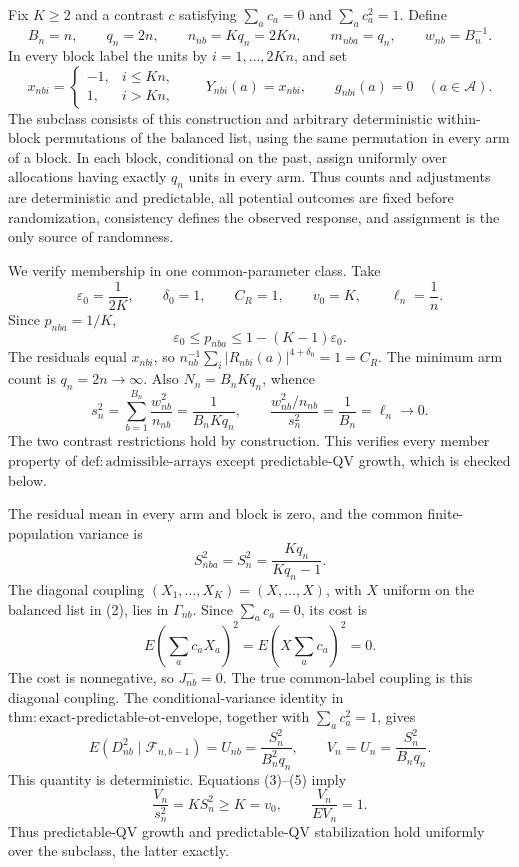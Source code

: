 Fix \(K\ge2\) and a contrast \(c\) satisfying \(\sum_ac_a=0\) and \(\sum_ac_a^2=1\). Define
\[
B_n=n,\qquad q_n=2n,\qquad n_{nb}=Kq_n=2Kn,
\qquad m_{nba}=q_n,\qquad w_{nb}=B_n^{-1}.
\tag{1}
\]
In every block label the units by \(i=1,\ldots,2Kn\), and set
\[
x_{nbi}=\begin{cases}-1,&i\le Kn,\\1,&i>Kn,\end{cases}
\qquad
Y_{nbi}(a)=x_{nbi},\qquad g_{nbi}(a)=0
\quad(a\in\mathcal A).
\tag{2}
\]
The subclass consists of this construction and arbitrary deterministic within-block permutations of the balanced list, using the same permutation in every arm of a block. In each block, conditional on the past, assign uniformly over allocations having exactly \(q_n\) units in every arm. Thus counts and adjustments are deterministic and predictable, all potential outcomes are fixed before randomization, consistency defines the observed response, and assignment is the only source of randomness.

We verify membership in one common-parameter class. Take
\[
\varepsilon_0=\frac1{2K},\qquad \delta_0=1,
\qquad C_R=1,\qquad v_0=K,\qquad \ell_n=\frac1n.
\]
Since \(p_{nba}=1/K\),
\[
\varepsilon_0\le p_{nba}\le1-(K-1)\varepsilon_0.
\]
The residuals equal \(x_{nbi}\), so
\(n_{nb}^{-1}\sum_i|R_{nbi}(a)|^{4+\delta_0}=1=C_R\). The minimum arm count is \(q_n=2n\to\infty\). Also \(N_n=B_nKq_n\), whence
\[
s_n^2=\sum_{b=1}^{B_n}\frac{w_{nb}^2}{n_{nb}}
=\frac1{B_nKq_n},
\qquad
\frac{w_{nb}^2/n_{nb}}{s_n^2}
=\frac1{B_n}=\ell_n\longrightarrow0.
\tag{3}
\]
The two contrast restrictions hold by construction. This verifies every member property of \(\mathrm{def:admissible\text{-}arrays}\) except predictable-QV growth, which is checked below.

The residual mean in every arm and block is zero, and the common finite-population variance is
\[
S_{nba}^2=S_n^2=\frac{Kq_n}{Kq_n-1}.
\tag{4}
\]
The diagonal coupling \((X_1,\ldots,X_K)=(X,\ldots,X)\), with \(X\) uniform on the balanced list in (2), lies in \(\Gamma_{nb}\). Since \(\sum_ac_a=0\), its cost is
\[
E\left(\sum_ac_aX_a\right)^2
=E\left(X\sum_ac_a\right)^2=0.
\]
The cost is nonnegative, so \(J_{nb}^{-}=0\). The true common-label coupling is this diagonal coupling. The conditional-variance identity in \(\mathrm{thm:exact\text{-}predictable\text{-}ot\text{-}envelope}\), together with \(\sum_ac_a^2=1\), gives
\[
E(D_{nb}^2\mid\mathcal F_{n,b-1})
=U_{nb}=\frac{S_n^2}{B_n^2q_n},
\qquad
V_n=U_n=\frac{S_n^2}{B_nq_n}.
\tag{5}
\]
This quantity is deterministic. Equations (3)--(5) imply
\[
\frac{V_n}{s_n^2}=KS_n^2\ge K=v_0,
\qquad
\frac{V_n}{E V_n}=1.
\tag{6}
\]
Thus predictable-QV growth and predictable-QV stabilization hold uniformly over the subclass, the latter exactly.

